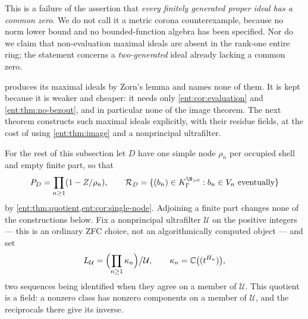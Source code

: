 \documentclass[11pt]{article}
\theoremstyle{plain}
\theoremstyle{plain}
\theoremstyle{plain}
\theoremstyle{definition}
\theoremstyle{definition}
\theoremstyle{definition}
\theoremstyle{definition}
\theoremstyle{remark}
\newcommand{\C}{\mathbb C}\newcommand{\R}{\mathbb R}
\newcommand{\K}{K_\Gamma}\newcommand{\KD}{K_\Delta}
\newcommand{\RD}{\mathcal R_D}\newcommand{\Ucal}{\mathcal U}
\begin{document}
This is a failure of the assertion that \emph{every finitely generated proper
ideal has a common zero}. We do not call it a metric corona counterexample,
because no norm lower bound and no bounded-function algebra has been
specified. Nor do we claim that non-evaluation maximal ideals are absent in
the rank-one entire ring; the statement concerns a \emph{two-generated} ideal
already lacking a common zero.

 produces its maximal ideals by Zorn's lemma
and names none of them. It is kept because it is weaker and cheaper: it needs
only \cref{ent:cor:evaluation} and \cref{ent:thm:no-bezout}, and in
particular none of the image theorem. The next theorem constructs such
maximal ideals explicitly, with their residue fields, at the cost of using
\cref{ent:thm:image} and a nonprincipal ultrafilter.

For the rest of this subsection let $D$ have one simple node $\rho_n$ per
occupied shell and empty finite part, so that
\[
 P_D=\prod_{n\ge1}(1-Z/\rho_n),
 \qquad
 \RD=\{(b_n)\in\K^{\N_{>0}}:b_n\in V_n\text{ eventually}\}
\]
by \cref{ent:thm:quotient,ent:cor:single-node}. Adjoining a finite part
changes none of the constructions below. Fix a nonprincipal ultrafilter
$\Ucal$ on the positive integers --- this is an ordinary ZFC choice, not an
algorithmically computed object --- and set
\begin{equation}\label{ent:eq:ultraproduct}
 L_\Ucal=\Bigl(\prod_{n\ge1}\kappa_n\Bigr)\big/\Ucal,
 \qquad
 \kappa_n=\C\bigl((t^{H_n})\bigr),
\end{equation}
two sequences being identified when they agree on a member of $\Ucal$. This
quotient is a field: a nonzero class has nonzero components on a member of
$\Ucal$, and the reciprocals there give its inverse.
\end{document}
